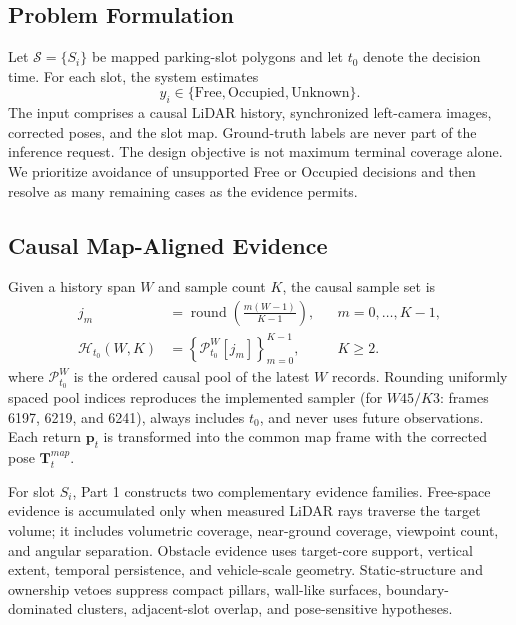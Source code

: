 \documentclass[conference]{IEEEtran}
\begin{document}
\subsection{Problem Formulation}
Let $\mathcal{S}=\{S_i\}$ be mapped parking-slot polygons and let $t_0$ denote the decision time. For each slot, the system estimates
\begin{equation}
 y_i \in \{\mathrm{Free},\mathrm{Occupied},\mathrm{Unknown}\}.
\end{equation}
The input comprises a causal LiDAR history, synchronized left-camera images, corrected poses, and the slot map. Ground-truth labels are never part of the inference request. The design objective is not maximum terminal coverage alone. We prioritize avoidance of unsupported Free or Occupied decisions and then resolve as many remaining cases as the evidence permits.

\subsection{Causal Map-Aligned Evidence}
Given a history span $W$ and sample count $K$, the causal sample set is
\begin{equation}
\begin{aligned}
j_m &= \operatorname{round}\!\left(\frac{m(W-1)}{K-1}\right),
      &&m=0,\ldots,K-1,\\
\mathcal{H}_{t_0}(W,K) &=
\left\{\mathcal{P}_{t_0}^{W}[j_m]\right\}_{m=0}^{K-1},
      &&K\geq2.
\end{aligned}
\end{equation}
where $\mathcal{P}_{t_0}^{W}$ is the ordered causal pool of the latest $W$ records. Rounding uniformly spaced pool indices reproduces the implemented sampler (for $W45/K3$: frames 6197, 6219, and 6241), always includes $t_0$, and never uses future observations. Each return $\mathbf{p}_{t}$ is transformed into the common map frame with the corrected pose $\mathbf{T}^{map}_{t}$.

For slot $S_i$, Part 1 constructs two complementary evidence families. Free-space evidence is accumulated only when measured LiDAR rays traverse the target volume; it includes volumetric coverage, near-ground coverage, viewpoint count, and angular separation. Obstacle evidence uses target-core support, vertical extent, temporal persistence, and vehicle-scale geometry. Static-structure and ownership vetoes suppress compact pillars, wall-like surfaces, boundary-dominated clusters, adjacent-slot overlap, and pose-sensitive hypotheses.
\end{document}
